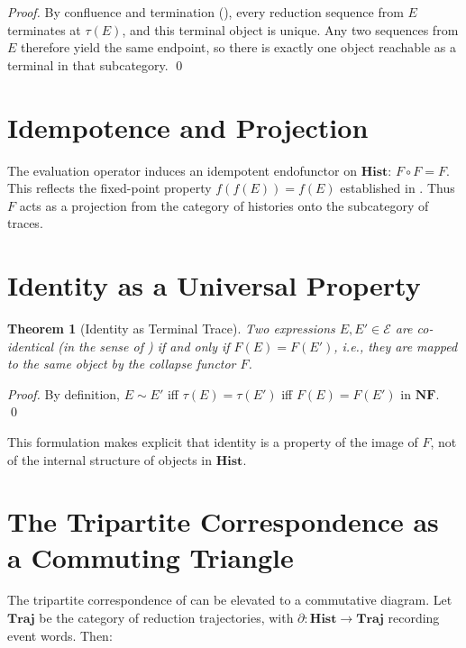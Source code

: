 \documentclass[12pt, oneside]{amsbook}
\theoremstyle{plain}
\newtheorem{theorem}{Theorem}[section]
\theoremstyle{definition}
\theoremstyle{remark}
\newcommand{\Expr}{\mathcal{E}}
\newcommand{\evalf}{f}
\newcommand{\trace}{\tau}
\newcommand{\tequiv}{\sim}
\newcommand{\eventword}{\partial}
\begin{document}
\begin{proof}
By confluence and termination (), every reduction sequence
from $E$ terminates at $\trace(E)$, and this terminal object is unique. Any two
sequences from $E$ therefore yield the same endpoint, so there is exactly one
object reachable as a terminal in that subcategory. \qed
\end{proof}

\section{Idempotence and Projection}
\label{app:cat:idempotent}

The evaluation operator induces an idempotent endofunctor on $\mathbf{Hist}$:
$F \circ F = F$. This reflects the fixed-point property $\evalf(\evalf(E)) =
\evalf(E)$ established in . Thus $F$ acts as a projection
from the category of histories onto the subcategory of traces.

\section{Identity as a Universal Property}
\label{app:cat:universal}

\begin{theorem}[Identity as Terminal Trace]
\label{thm:cat-identity}
  Two expressions $E, E' \in \Expr$ are co-identical (in the sense of
  ) if and only if $F(E) = F(E')$, i.e., they are mapped
  to the same object by the collapse functor $F$.
\end{theorem}

\begin{proof}
By definition, $E \tequiv E'$ iff $\trace(E) = \trace(E')$ iff $F(E) = F(E')$
in $\mathbf{NF}$. \qed
\end{proof}

This formulation makes explicit that identity is a property of the image of
$F$, not of the internal structure of objects in $\mathbf{Hist}$.

\section{The Tripartite Correspondence as a Commuting Triangle}
\label{app:cat:triangle}

The tripartite correspondence of  can be elevated to
a commutative diagram. Let $\mathbf{Traj}$ be the category of reduction
trajectories, with $\eventword : \mathbf{Hist} \to \mathbf{Traj}$ recording
event words. Then:
\end{document}
